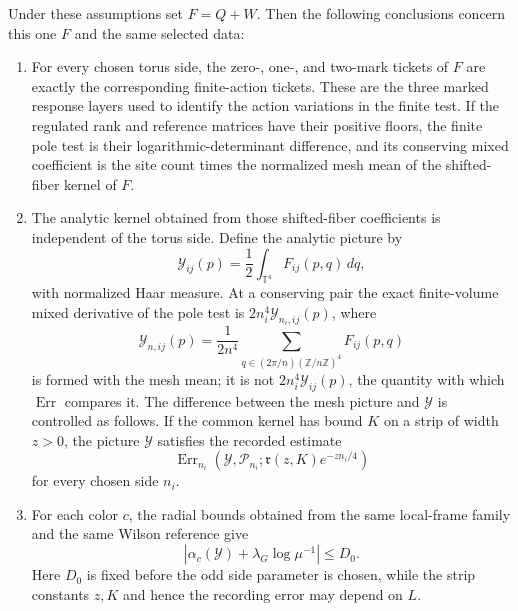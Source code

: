 \begin{lemma}
\label{lem:ex-annulus-same-data}
Under these assumptions set $F=Q+W$. Then the following conclusions concern
this one $F$ and the same selected data:

\begin{enumerate}
\item For every chosen torus side, the zero-, one-, and two-mark tickets
  of $F$ are exactly the corresponding finite-action tickets. These are
  the three marked response layers used to identify the action variations
  in the finite test. If the regulated rank and
  reference matrices have their positive floors, the finite pole test is
  their logarithmic-determinant difference, and its conserving mixed
  coefficient is the site count times the normalized mesh mean of the
  shifted-fiber kernel of $F$.
\item The analytic kernel obtained from those shifted-fiber coefficients
  is independent of the torus side. Define the analytic picture by
  \[
    \mathcal Y_{ij}(p)=\frac12\int_{\mathbb T^4}F_{ij}(p,q)\,dq,
  \]
  with normalized Haar measure. At a conserving pair the exact
  finite-volume mixed derivative of the pole test is
  $2n_i^4\mathcal Y_{n_i,ij}(p)$, where
  \[
   \mathcal Y_{n,ij}(p)=\frac1{2n^4}
     \sum_{q\in(2\pi/n)(\mathbb Z/n\mathbb Z)^4}F_{ij}(p,q)
  \]
  is formed with the mesh mean; it is not $2n_i^4\mathcal Y_{ij}(p)$,
  the quantity with which $\operatorname{Err}$ compares it. The
  difference between the mesh picture and $\mathcal Y$ is controlled as
  follows. If the common kernel has bound $K$ on
  a strip of width $z>0$, the picture $\mathcal Y$ satisfies the
  recorded estimate
  \[
    \operatorname{Err}_{n_i}(\mathcal Y,\mathcal P_{n_i};
       \mathfrak r(z,K)e^{-zn_i/4})
  \]
  for every chosen side $n_i$.
\item For each color $c$, the radial bounds obtained from the same
  local-frame family and the same Wilson reference give
  \[
    |\alpha_c(\mathcal Y)+\lambda_G\log\mu^{-1}|\leq D_0.
  \]
  Here $D_0$ is fixed before the odd side parameter is chosen, while the
  strip constants $z,K$ and hence the recording error may depend on $L$.
\end{enumerate}
\end{lemma}
